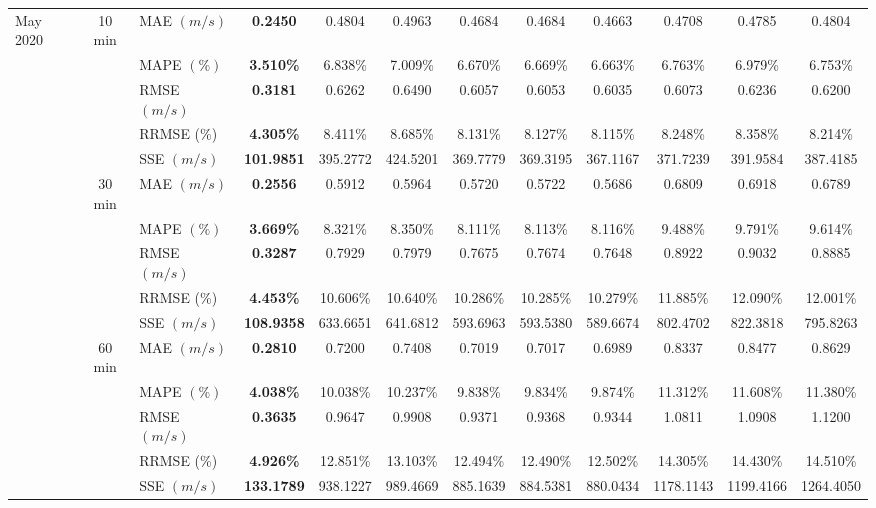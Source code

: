 {\begin{longtable}[htb!]{lllccccccccc}
May 2020 & \multicolumn{1}{c}{10 min} & MAE {$(m/s)$} & \textbf{0.2450} & 0.4804 & 0.4963 & 0.4684 & 0.4684 & 0.4663 & {0.4708} & {0.4785} & {0.4804} \\
&  & MAPE {$(\%)$} & \textbf{3.510\%} & 6.838\% & 7.009\% & 6.670\% & 6.669\% & 6.663\% & {6.763\%} & {6.979\%} & {6.753\%} \\
&  & RMSE {$(m/s)$} & \textbf{0.3181} & 0.6262 & 0.6490 & 0.6057 & 0.6053 & 0.6035 & {0.6073} & {0.6236} & {0.6200} \\
&  & {RRMSE {(\%)}} & {\textbf{4.305\%}} & {8.411\%} & {8.685\%} & {8.131\%} & {8.127\%} & {8.115\%} & {8.248\%} & {8.358\%} & {8.214\%} \\
&  & {SSE {$(m/s)$}} & {\textbf{101.9851}} & {395.2772} & {424.5201} & {369.7779} & {369.3195} & {367.1167} & {371.7239} & {391.9584} & {387.4185} \\
& \multicolumn{1}{c}{30 min} & MAE {$(m/s)$} & \textbf{0.2556} & 0.5912 & 0.5964 & 0.5720 & 0.5722 & 0.5686 & {0.6809} & {0.6918} & {0.6789} \\
&  & MAPE {$(\%)$} & \textbf{3.669\%} & 8.321\% & 8.350\% & 8.111\% & 8.113\% & 8.116\% & {9.488\%} & {9.791\%} & {9.614\%} \\
&  & RMSE {$(m/s)$} & \textbf{0.3287} & 0.7929 & 0.7979 & 0.7675 & 0.7674 & 0.7648 & {0.8922} & {0.9032} & {0.8885} \\
&  & {RRMSE {(\%)}} & {\textbf{4.453\%}} & {10.606\%} & {10.640\%} & {10.286\%} & {10.285\%} & {10.279\%} & {11.885\%} & {12.090\%} & {12.001\%} \\
&  & {SSE {$(m/s)$}} & {\textbf{108.9358}} & {633.6651} & {641.6812} & {593.6963} & {593.5380} & {589.6674} & {802.4702} & {822.3818} & {795.8263} \\
& \multicolumn{1}{c}{60 min} & MAE {$(m/s)$} & \textbf{0.2810} & 0.7200 & 0.7408 & 0.7019 & 0.7017 & 0.6989 & {0.8337} & {0.8477} & {0.8629} \\
&  & MAPE {$(\%)$} & \textbf{4.038\%} & 10.038\% & 10.237\% & 9.838\% & 9.834\% & 9.874\% & {11.312\%} & {11.608\%} & {11.380\%} \\
&  & RMSE {$(m/s)$} & \textbf{0.3635} & 0.9647 & 0.9908 & 0.9371 & 0.9368 & 0.9344 & {1.0811} & {1.0908} & {1.1200} \\
&  & {RRMSE {(\%)}} & {\textbf{4.926\%}} & {12.851\%} & {13.103\%} & {12.494\%} & {12.490\%} & {12.502\%} & {14.305\%} & {14.430\%} & {14.510\%} \\
&  & {SSE {$(m/s)$}} & {\textbf{133.1789}} & {938.1227} & {989.4669} & {885.1639} & {884.5381} & {880.0434} & {1178.1143} & {1199.4166} & {1264.4050} \\ \hline
\end{longtable}
}